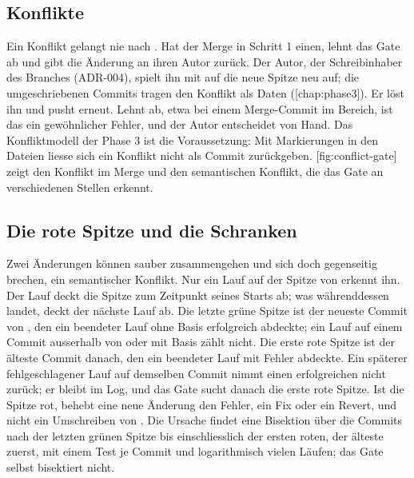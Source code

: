 \subsection{Konflikte}

Ein Konflikt gelangt nie nach .
Hat der Merge in Schritt 1 einen, lehnt das Gate ab und gibt die Änderung an ihren Autor zurück.
Der Autor, der Schreibinhaber des Branches (ADR-004), spielt ihn mit  auf die neue
Spitze neu auf; die umgeschriebenen Commits tragen den Konflikt als Daten
([chap:phase3]).
Er löst ihn und pusht erneut.
Lehnt  ab, etwa bei einem Merge-Commit im Bereich, ist das ein gewöhnlicher Fehler,
und der Autor entscheidet von Hand.
Das Konfliktmodell der Phase 3 ist die Voraussetzung: Mit Markierungen in den Dateien liesse sich
ein Konflikt nicht als Commit zurückgeben.
[fig:conflict-gate] zeigt den Konflikt im Merge und den semantischen Konflikt,
die das Gate an verschiedenen Stellen erkennt.

\startplacefigure[title={Konflikte am Merge-Gate: im Merge und auf der Spitze von main},
    reference=fig:conflict-gate,location=here]
\stopplacefigure

\subsection{Die rote Spitze und die Schranken}

Zwei Änderungen können sauber zusammengehen und sich doch gegenseitig brechen, ein semantischer
Konflikt.
Nur ein Lauf auf der Spitze von  erkennt ihn.
Der Lauf deckt die Spitze zum Zeitpunkt seines Starts ab; was währenddessen landet, deckt der
nächste Lauf ab.
Die letzte grüne Spitze ist der neueste Commit von , den ein beendeter Lauf ohne
Basis erfolgreich abdeckte; ein Lauf auf einem Commit ausserhalb von  oder mit Basis
zählt nicht.
Die erste rote Spitze ist der älteste Commit danach, den ein beendeter Lauf mit Fehler abdeckte.
Ein späterer fehlgeschlagener Lauf auf demselben Commit nimmt einen erfolgreichen nicht zurück;
er bleibt im Log, und das Gate sucht danach die erste rote Spitze.
Ist die Spitze rot, behebt eine neue Änderung den Fehler, ein Fix oder ein Revert, und nicht ein
Umschreiben von .
Die Ursache findet eine Bisektion über die Commits nach der letzten grünen Spitze bis
einschliesslich der ersten roten, der älteste zuerst, mit einem Test je Commit und
logarithmisch vielen Läufen; das Gate selbst bisektiert nicht.

